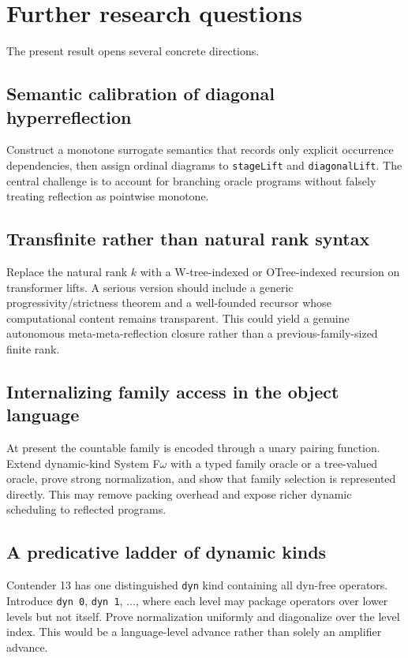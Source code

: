 \documentclass[11pt]{article}
\theoremstyle{definition}
\newcommand{\code}[1]{\texttt{#1}}
\begin{document}
\section{Further research questions}

The present result opens several concrete directions.

\subsection{Semantic calibration of diagonal hyperreflection}
Construct a monotone surrogate semantics that records only explicit occurrence dependencies, then assign ordinal diagrams to \code{stageLift} and \code{diagonalLift}.  The central challenge is to account for branching oracle programs without falsely treating reflection as pointwise monotone.

\subsection{Transfinite rather than natural rank syntax}
Replace the natural rank $k$ with a W-tree-indexed or OTree-indexed recursion on transformer lifts.  A serious version should include a generic progressivity/strictness theorem and a well-founded recursor whose computational content remains transparent.  This could yield a genuine autonomous meta-meta-reflection closure rather than a previous-family-sized finite rank.

\subsection{Internalizing family access in the object language}
At present the countable family is encoded through a unary pairing function.  Extend dynamic-kind System F$\omega$ with a typed family oracle or a tree-valued oracle, prove strong normalization, and show that family selection is represented directly.  This may remove packing overhead and expose richer dynamic scheduling to reflected programs.

\subsection{A predicative ladder of dynamic kinds}
Contender 13 has one distinguished \code{dyn} kind containing all dyn-free operators.  Introduce \code{dyn 0}, \code{dyn 1}, $\ldots$, where each level may package operators over lower levels but not itself.  Prove normalization uniformly and diagonalize over the level index.  This would be a language-level advance rather than solely an amplifier advance.
\end{document}

